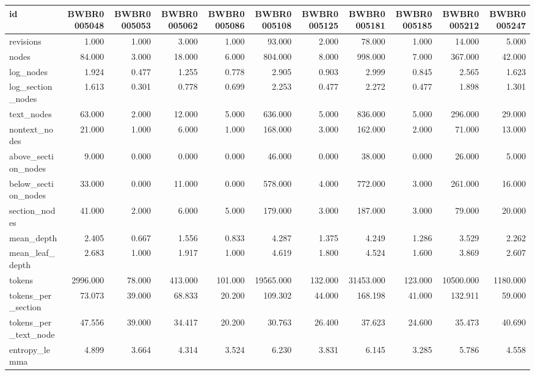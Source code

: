 \begin{tabular}{lrrrrrrrrrr}
\toprule
id & BWBR0005048 & BWBR0005053 & BWBR0005062 & BWBR0005086 & BWBR0005108 & BWBR0005125 & BWBR0005181 & BWBR0005185 & BWBR0005212 & BWBR0005247 \\
\midrule
revisions & 1.000 & 1.000 & 3.000 & 1.000 & 93.000 & 2.000 & 78.000 & 1.000 & 14.000 & 5.000 \\
\cline{1-11}
nodes & 84.000 & 3.000 & 18.000 & 6.000 & 804.000 & 8.000 & 998.000 & 7.000 & 367.000 & 42.000 \\
\cline{1-11}
log\_nodes & 1.924 & 0.477 & 1.255 & 0.778 & 2.905 & 0.903 & 2.999 & 0.845 & 2.565 & 1.623 \\
\cline{1-11}
log\_section\_nodes & 1.613 & 0.301 & 0.778 & 0.699 & 2.253 & 0.477 & 2.272 & 0.477 & 1.898 & 1.301 \\
\cline{1-11}
text\_nodes & 63.000 & 2.000 & 12.000 & 5.000 & 636.000 & 5.000 & 836.000 & 5.000 & 296.000 & 29.000 \\
\cline{1-11}
nontext\_nodes & 21.000 & 1.000 & 6.000 & 1.000 & 168.000 & 3.000 & 162.000 & 2.000 & 71.000 & 13.000 \\
\cline{1-11}
above\_section\_nodes & 9.000 & 0.000 & 0.000 & 0.000 & 46.000 & 0.000 & 38.000 & 0.000 & 26.000 & 5.000 \\
\cline{1-11}
below\_section\_nodes & 33.000 & 0.000 & 11.000 & 0.000 & 578.000 & 4.000 & 772.000 & 3.000 & 261.000 & 16.000 \\
\cline{1-11}
section\_nodes & 41.000 & 2.000 & 6.000 & 5.000 & 179.000 & 3.000 & 187.000 & 3.000 & 79.000 & 20.000 \\
\cline{1-11}
mean\_depth & 2.405 & 0.667 & 1.556 & 0.833 & 4.287 & 1.375 & 4.249 & 1.286 & 3.529 & 2.262 \\
\cline{1-11}
mean\_leaf\_depth & 2.683 & 1.000 & 1.917 & 1.000 & 4.619 & 1.800 & 4.524 & 1.600 & 3.869 & 2.607 \\
\cline{1-11}
tokens & 2996.000 & 78.000 & 413.000 & 101.000 & 19565.000 & 132.000 & 31453.000 & 123.000 & 10500.000 & 1180.000 \\
\cline{1-11}
tokens\_per\_section & 73.073 & 39.000 & 68.833 & 20.200 & 109.302 & 44.000 & 168.198 & 41.000 & 132.911 & 59.000 \\
\cline{1-11}
tokens\_per\_text\_node & 47.556 & 39.000 & 34.417 & 20.200 & 30.763 & 26.400 & 37.623 & 24.600 & 35.473 & 40.690 \\
\cline{1-11}
entropy\_lemma & 4.899 & 3.664 & 4.314 & 3.524 & 6.230 & 3.831 & 6.145 & 3.285 & 5.786 & 4.558 \\

\end{tabular}
